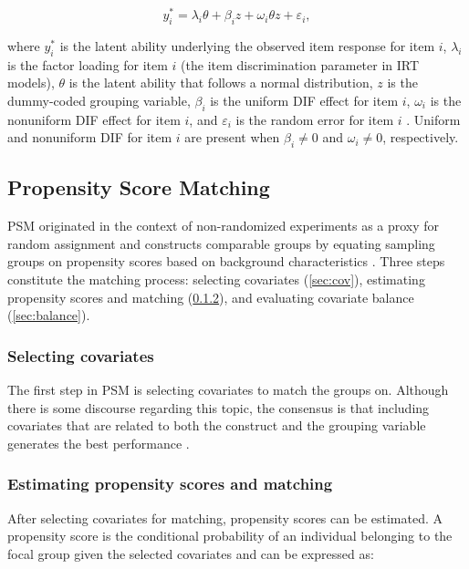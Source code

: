 \documentclass{article}
\begin{document}
\begin{equation} \label{eq:mimic_oneitem}
    y_i^* = \lambda_i\theta + \beta_i z + \omega_i\theta z + \varepsilon_i,
\end{equation}

where $y_i^*$ is the latent ability underlying the observed item response for item $i$, $\lambda_i$ is the factor loading for item $i$ (the item discrimination parameter in IRT models), $\theta$ is the latent ability that follows a normal distribution, $z$ is the dummy-coded grouping variable, $\beta_i$ is the uniform DIF effect for item $i$, $\omega_i$ is the nonuniform DIF effect for item $i$, and $\varepsilon_i$ is the random error for item $i$ \citep{bulut2017detecting}. Uniform and nonuniform DIF for item $i$ are present when $\beta_i \neq 0$ and $\omega_i \neq 0$, respectively.  

\subsection{Propensity Score Matching} \label{sec:psm}

PSM originated in the context of non-randomized experiments as a proxy for random assignment and constructs comparable groups by equating sampling groups on propensity scores based on background characteristics \citep{rosenbaum1983central}. Three steps constitute the matching process: selecting covariates (\ref{sec:cov}), estimating propensity scores and matching (\ref{sec:est_psm}), and evaluating covariate balance (\ref{sec:balance}). 

\subsubsection{Selecting covariates} \label{sec:select_cov}

The first step in PSM is selecting covariates to match the groups on. Although there is some discourse regarding this topic, the consensus is that including covariates that are related to both the construct and the grouping variable generates the best performance \citep{stuart2010matching}. 

\subsubsection{Estimating propensity scores and matching} \label{sec:est_psm}

After selecting covariates for matching, propensity scores can be estimated. A propensity score is the conditional probability of an individual belonging to the focal group given the selected covariates and can be expressed as:
\end{document}

